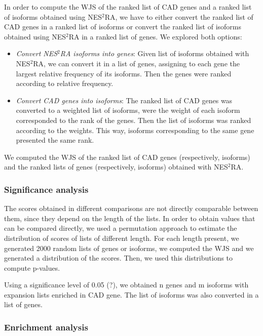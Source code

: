 \documentclass[fleqn,10pt]{SelfArx} %
\begin{document}
In order to compute the WJS of the ranked list of CAD genes and a ranked list of isoforms obtained using NES$^2$RA, we have to either convert the ranked list of CAD genes in a ranked list of isoforms or convert the ranked list of isoforms obtained using NES$^2$RA in a ranked list of genes. We explored both options:

\begin{itemize}
	\item \textit{Convert NES$^2$RA isoforms into genes}: Given list of isoforms obtained with NES$^2$RA, we can convert it in a list of genes, assigning to each gene the largest relative frequency of its isoforms. Then the genes were ranked according to relative frequency.
	\item \textit{Convert CAD genes into isoforms}: The ranked list of CAD genes was converted to a weighted list of isoforms, were the weight of each isoform corresponded to the rank of the genes. Then the list of isoforms was ranked according to the weights. This way, isoforms corresponding to the same gene presented the same rank.
\end{itemize}

We computed the WJS of the ranked list of CAD genes (respectively, isoforms) and the ranked lists of genes (respectively, isoforms) obtained with NES$^2$RA.

\subsubsection{Significance analysis} 

The scores obtained in different comparisons are not directly comparable between them, since they depend on the length of the lists. In order to obtain values that can be compared directly, we used a permutation approach to estimate the distribution of scores of lists of different length. For each length present, we generated 2000 random lists of genes or isoforms, we computed the WJS and we generated a distribution of the scores. Then, we used this distributions to compute p-values.

Using a significance level of 0.05 (?), we obtained n genes and m isoforms with expansion lists enriched in CAD gene. The list of isoforms was also converted in a list of genes.

\subsubsection{Enrichment analysis}
\end{document}
